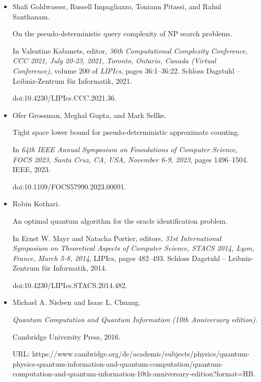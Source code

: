 \begin{itemize}
\item[] 
[18]

Shafi Goldwasser, Russell Impagliazzo, Toniann Pitassi, and Rahul Santhanam.


On the pseudo-deterministic query complexity of NP search problems.


In Valentine Kabanets, editor, \emph{36th Computational Complexity
Conference, CCC 2021, July 20-23, 2021, Toronto, Ontario, Canada (Virtual
Conference)}, volume 200 of \emph{LIPIcs}, pages 36:1–36:22. Schloss Dagstuhl
– Leibniz-Zentrum für Informatik, 2021.


doi:10.4230/LIPIcs.CCC.2021.36.





\item[] 
[19]

Ofer Grossman, Meghal Gupta, and Mark Sellke.


Tight space lower bound for pseudo-deterministic approximate
counting.


In \emph{64th IEEE Annual Symposium on Foundations of Computer
Science, FOCS 2023, Santa Cruz, CA, USA, November 6-9, 2023}, pages
1496–1504. IEEE, 2023.


doi:10.1109/FOCS57990.2023.00091.





\item[] 
[20]

Robin Kothari.


An optimal quantum algorithm for the oracle identification problem.


In Ernst W. Mayr and Natacha Portier, editors, \emph{31st
International Symposium on Theoretical Aspects of Computer Science, STACS
2014, Lyon, France, March 5-8, 2014}, LIPIcs, pages 482–493. Schloss
Dagstuhl – Leibniz-Zentrum für Informatik, 2014.


doi:10.4230/LIPIcs.STACS.2014.482.





\item[] 
[21]

Michael A. Nielsen and Isaac L. Chuang.


\emph{Quantum Computation and Quantum Information (10th Anniversary
edition)}.


Cambridge University Press, 2016.


URL:
https://www.cambridge.org/de/academic/subjects/physics/quantum-physics-quantum-information-and-quantum-computation/quantum-computation-and-quantum-information-10th-anniversary-edition?format=HB.






\end{itemize}
